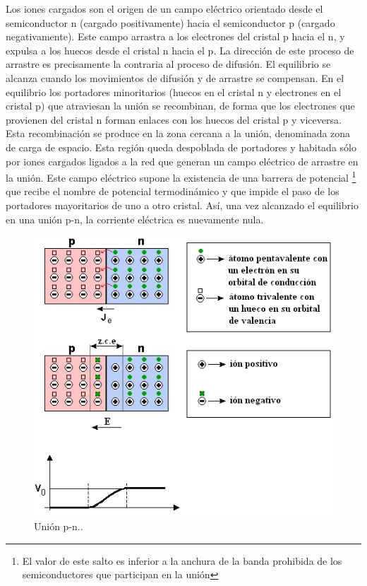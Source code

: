 Los iones cargados son el origen de un campo eléctrico orientado desde
el semiconductor n (cargado positivamente) hacia el semiconductor
p (cargado negativamente). Este campo arrastra a los electrones del
cristal p hacia el n, y expulsa a los huecos desde el cristal n hacia
el p. La dirección de este proceso de arrastre es precisamente la
contraria al proceso de difusión. El equilibrio se alcanza cuando
los movimientos de difusión y de arrastre se compensan. En el equilibrio
los portadores minoritarios (huecos en el cristal n y electrones en
el cristal p) que atraviesan la unión se recombinan, de forma que
los electrones que provienen del cristal n forman enlaces con los
huecos del cristal p y viceversa. Esta recombinación se produce en
la zona cercana a la unión, denominada zona de carga de espacio. Esta
región queda despoblada de portadores y habitada sólo por iones cargados
ligados a la red que generan un campo eléctrico de arrastre en la
unión. Este campo eléctrico supone la existencia de una barrera de
potencial%
\footnote{El valor de este salto es inferior a la anchura de la banda prohibida
de los semiconductores que participan en la unión%
} que recibe el nombre de potencial termodinámico y que impide el paso
de los portadores mayoritarios de uno a otro cristal. Así, una vez
alcanzado el equilibrio en una unión p-n, la corriente eléctrica es
nuevamente nula.

%
\begin{figure}
\includegraphics[scale=0.5]{../figs/Diodo_pn_-_zona_de_carga_espacial}

\caption{Unión p-n.\label{fig:Uni=0000F3n-p-n}.}



\end{figure}


